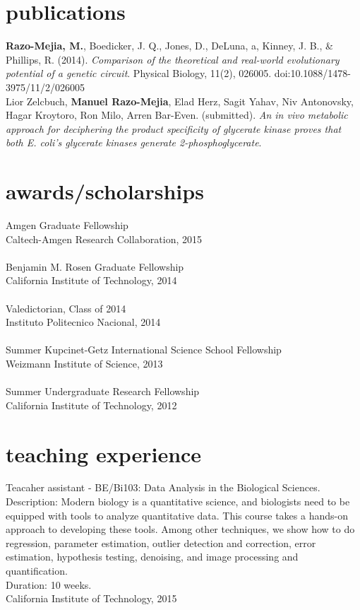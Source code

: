 \documentclass[]{friggeri-cv}
\begin{document}
\section{publications}
\textbf{Razo-Mejia, M.}, Boedicker, J. Q., Jones, D., DeLuna, a, Kinney, J. B., & Phillips, R. (2014). \textit{Comparison of the theoretical and real-world evolutionary potential of a genetic circuit}. Physical Biology, 11(2), 026005. doi:10.1088/1478-3975/11/2/026005\\

Lior Zelcbuch, \textbf{Manuel Razo-Mejia}, Elad Herz, Sagit Yahav, Niv Antonovsky, Hagar Kroytoro, Ron Milo, Arren Bar-Even. (submitted). \textit{An in vivo metabolic approach for deciphering the product specificity of glycerate kinase proves that both E. coli's glycerate kinases generate 2-phosphoglycerate}.

\newpage 
\section{awards/scholarships}
Amgen Graduate Fellowship\\
{Caltech-Amgen Research Collaboration, 2015}\\
\\
Benjamin M. Rosen Graduate Fellowship\\
{California Institute of Technology, 2014}\\
\\
Valedictorian, Class of 2014\\
{Instituto Politecnico Nacional, 2014}\\
\\
Summer Kupcinet-Getz International Science School Fellowship\\
{Weizmann Institute of Science, 2013}\\
\\
Summer Undergraduate Research Fellowship\\
{California Institute of Technology, 2012}\\

\section{teaching experience}
Teacaher assistant - BE/Bi103: Data Analysis in the Biological Sciences.\\
Description: Modern biology is a quantitative science, and biologists need to be equipped with tools to analyze quantitative data. This course takes a hands-on approach to developing these tools. Among other techniques, we show how to do regression, parameter estimation, outlier detection and correction, error estimation, hypothesis testing, denoising, and image processing and quantification.\\
Duration: 10 weeks.\\
{California Institute of Technology, 2015}\\
\end{document}

